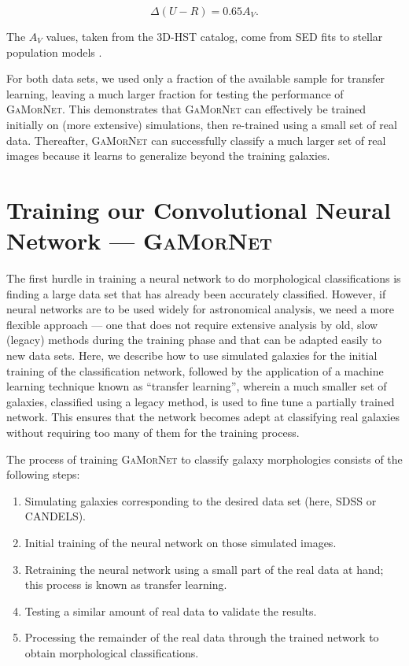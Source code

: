 \documentclass[twocolumn]{aastex63}
\newcommand\gamornet{G\textsc{a}M\textsc{or}N\textsc{et}}
\begin{document}
\begin{equation}
    \Delta (U-R) = 0.65 A_V  .
\end{equation}

\noindent
The $A_V$ values, taken from the 3D-HST catalog, come from SED fits to stellar population models \citep{3dhst}. 

For both data sets, we used only a fraction of the available sample for transfer learning, leaving a much larger fraction for testing the performance of \gamornet{}. This demonstrates that \gamornet{} can effectively be trained initially on (more extensive) simulations, then re-trained using a small set of real data. Thereafter, \gamornet{} can successfully classify a much larger set of real images because it learns to generalize beyond the training galaxies.


\section{Training our Convolutional Neural Network --- \gamornet{}} \label{sec:methods}

The first hurdle in training a neural network to do morphological classifications is finding a large data set that has already been accurately classified. However, if neural networks are to be used widely for astronomical analysis, we need a more flexible approach --- one that does not require extensive analysis by old, slow (legacy) methods during the training phase and that can be adapted easily to new data sets. Here, we describe how to use simulated galaxies for the initial training of the classification network, followed by the application of a machine learning technique known as ``transfer learning'', wherein a much smaller set of galaxies, classified using a legacy method, is used to fine tune a partially trained network. This ensures that the network becomes adept at classifying real galaxies without requiring too many of them for the training process.

The process of training \gamornet{} to classify galaxy morphologies consists of the following steps:
\begin{enumerate}[noitemsep]
\item Simulating galaxies corresponding to the desired data set (here, SDSS or CANDELS).
\item Initial training of the neural network on those simulated images.
\item Retraining the neural network using a small part of the real data at hand; this process is known as transfer learning.
\item Testing a similar amount of real data to validate the results.
\item Processing the remainder of the real data through the trained network to obtain morphological classifications. 
\end{enumerate}
 
\end{document}
